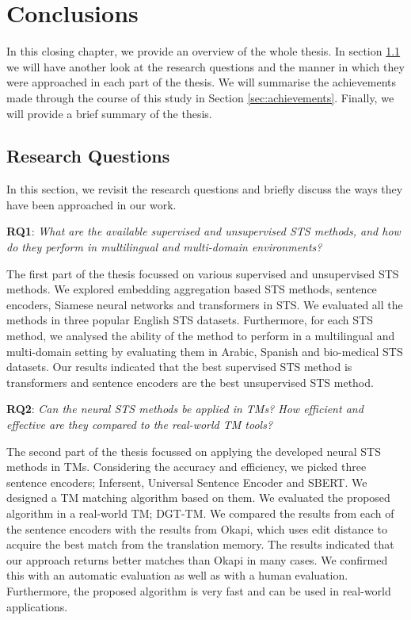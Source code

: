 \chapter{Conclusions}
\label{cha:conclusions}

In this closing chapter, we provide an overview of the whole thesis. In section \ref{sec:rq} we will have another look at the research questions and the manner in which they were approached in each part of the thesis. We will summarise the achievements made through the course of this study in Section \ref{sec:achievements}. Finally, we will provide a brief summary of the thesis.

\section{Research Questions}
\label{sec:rq}
In this section, we revisit the research questions and briefly discuss the ways they have been approached in our work.

\textbf{RQ1}: \textit{What are the available supervised and unsupervised STS methods, and how do they perform in multilingual and multi-domain environments?}

The first part of the thesis focussed on various supervised and unsupervised STS methods. We explored embedding aggregation based STS methods, sentence encoders, Siamese neural networks and transformers in STS. We evaluated all the methods in three popular English STS datasets. Furthermore, for each STS method, we analysed the ability of the method to perform in a multilingual and multi-domain setting by evaluating them in Arabic, Spanish and bio-medical STS datasets. Our results indicated that the best supervised STS method is transformers and sentence encoders are the best unsupervised STS method. 

\textbf{RQ2}: \textit{Can the neural STS methods be applied in TMs? How efficient and effective are they compared to the real-world TM tools?}

The second part of the thesis focussed on applying the developed neural STS methods in TMs. Considering the accuracy and efficiency, we picked three sentence encoders; Infersent, Universal Sentence Encoder and SBERT. We designed a TM matching algorithm based on them. We evaluated the proposed algorithm in a real-world TM; DGT-TM. We compared the results from each of the sentence encoders with the results from Okapi, which uses edit distance to acquire the best match from the translation memory. The results indicated that our approach returns better matches than Okapi in many cases. We confirmed this with an automatic evaluation as well as with a human evaluation. Furthermore, the proposed algorithm is very fast and can be used in real-world applications.

